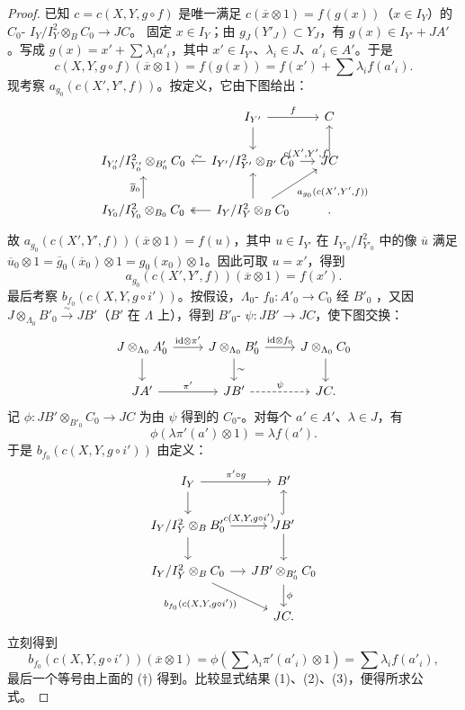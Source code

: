 \begin{proof}
已知 $c=c(X,Y,g\circ f)$ 是唯一满足 $c(\overline x\otimes1)=f(g(x))$（$x\in I_Y$）的 $C_0$- $I_Y/I_Y^2\otimes_B C_0\to JC$。
固定 $x\in I_Y$；由 $g_J(Y'_J)\subset Y_J$，有 $g(x)\in I_{Y'}+JA'$。写成 $g(x)=x'+\sum\lambda_i a'_i$，其中 $x'\in I_{Y'}$、$\lambda_i\in J$、$a'_i\in A'$。于是
\[c(X,Y,g\circ f)(\overline x\otimes1)=f(g(x))=f(x')+\sum\lambda_i f(a'_i).\tag{1}\]
现考察 $a_{g_0}(c(X',Y',f))$。按定义，它由下图给出：
\[
\begin{tikzcd}[column sep=small]
&I_{Y'}\arrow[r,"f"]\arrow[d]&C\\
I_{Y'_0}/I_{Y'_0}^2\otimes_{B'_0}C_0&I_{Y'}/I_{Y'}^2\otimes_{B'}C_0\arrow[l,"\sim"']\arrow[r,"{c(X',Y',f)}"]&JC\arrow[u,hook]\\
I_{Y_0}/I_{Y_0}^2\otimes_{B_0}C_0\arrow[u,"\overline g_0"]&I_Y/I_Y^2\otimes_B C_0\arrow[l,two heads]\arrow[u]\arrow[ur,"{a_{g_0}(c(X',Y',f))}"']&.
\end{tikzcd}
\]
故 $a_{g_0}(c(X',Y',f))(\overline x\otimes1)=f(u)$，其中 $u\in I_{Y'}$ 在 $I_{Y'_0}/I_{Y'_0}^2$ 中的像 $\overline u$ 满足 $\overline u_0\otimes1=\overline g_0(\overline x_0)\otimes1=g_0(x_0)\otimes1$。因此可取 $u=x'$，得到
\[a_{g_0}(c(X',Y',f))(\overline x\otimes1)=f(x').\tag{2}\]
最后考察 $b_{f_0}(c(X,Y,g\circ i'))$。按假设，$\Lambda_0$- $f_0:A'_0\to C_0$ 经 $B'_0$ ，又因 $J\otimes_{\Lambda_0}B'_0\xrightarrow\sim JB'$（$B'$ 在 $\Lambda$ 上），得到 $B'_0$- $\psi:JB'\to JC$，使下图交换：
\[
\begin{tikzcd}
J\otimes_{\Lambda_0}A'_0\arrow[r,"\mathrm{id}\otimes\pi'"]\arrow[d]&J\otimes_{\Lambda_0}B'_0\arrow[r,"\mathrm{id}\otimes f_0"]\arrow[d,"\sim"]&J\otimes_{\Lambda_0}C_0\arrow[d]\\
JA'\arrow[r,"\pi'"]&JB'\arrow[r,dashed,"\psi"]&JC.
\end{tikzcd}
\]
记 $\phi:JB'\otimes_{B'_0}C_0\to JC$ 为由 $\psi$ 得到的 $C_0$-。对每个 $a'\in A'$、$\lambda\in J$，有
\[\phi(\lambda\pi'(a')\otimes1)=\lambda f(a').\tag{$\dagger$}\]
于是 $b_{f_0}(c(X,Y,g\circ i'))$ 由定义：
\[
\begin{tikzcd}[column sep=small]
I_Y\arrow[r,"\pi'\circ g"]\arrow[d]&B'\\
I_Y/I_Y^2\otimes_B B'_0\arrow[r,"{c(X,Y,g\circ i')}"]\arrow[d]&JB'\arrow[u,hook]\arrow[d]\\
I_Y/I_Y^2\otimes_B C_0\arrow[r]\arrow[dr,"{b_{f_0}(c(X,Y,g\circ i'))}"']&JB'\otimes_{B'_0}C_0\arrow[d,"\phi"]\\
&JC.
\end{tikzcd}
\]
立刻得到
\[b_{f_0}(c(X,Y,g\circ i'))(\overline x\otimes1)=\phi\left(\sum\lambda_i\pi'(a'_i)\otimes1\right)=\sum\lambda_i f(a'_i),\tag{3}\]
最后一个等号由上面的 ($\dagger$) 得到。比较显式结果 (1)、(2)、(3)，便得所求公式。
\end{proof}
